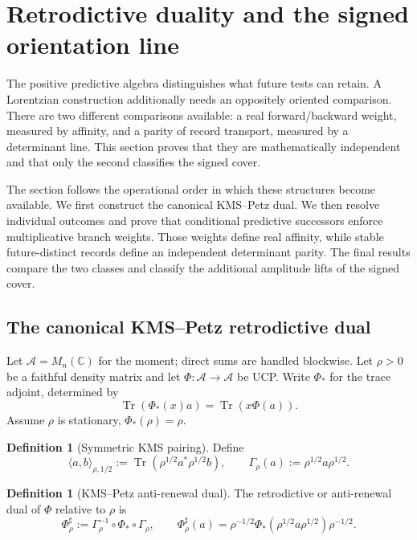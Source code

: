 \documentclass[11pt]{article}
\theoremstyle{definition}
\newtheorem{definition}[theorem]{Definition}
\theoremstyle{remark}
\newcommand{\C}{\mathbb C}
\newcommand{\Tr}{\operatorname{Tr}}
\newcommand{\A}{\mathcal A}
\newcommand{\GammaR}{\Gamma_{\rho}}
\begin{document}
\section{Retrodictive duality and the signed orientation line}
\label{sec:retrodictive}

The positive predictive algebra distinguishes what future tests can retain.  A
Lorentzian construction additionally needs an oppositely oriented comparison.
There are two different comparisons available: a real forward/backward
weight, measured by affinity, and a parity of record transport, measured by a
determinant line.  This section proves that they are mathematically
independent and that only the second classifies the signed cover.

The section follows the operational order in which these structures become
available.  We first construct the canonical KMS--Petz dual.  We then resolve
individual outcomes and prove that conditional predictive successors enforce
multiplicative branch weights.  Those weights define real affinity, while stable
future-distinct records define an independent determinant parity.  The final
results compare the two classes and classify the additional amplitude lifts of
the signed cover.

\subsection{The canonical KMS--Petz retrodictive dual}

Let $\A=M_n(\C)$ for the moment; direct sums are handled blockwise.  Let
$\rho>0$ be a faithful density matrix and let $\Phi:\A\to\A$ be UCP.  Write
$\Phi_*$ for the trace adjoint, determined by
\[
 \Tr(\Phi_*(x)a)=\Tr(x\Phi(a)).
\]
Assume $\rho$ is stationary, $\Phi_*(\rho)=\rho$.

\begin{definition}[Symmetric KMS pairing]
\label{def:kms-pairing}
Define
\[
 \langle a,b\rangle_{\rho,1/2}
 :=\Tr\!\left(\rho^{1/2}a^*\rho^{1/2}b\right),
 \qquad
 \GammaR(a):=\rho^{1/2}a\rho^{1/2}.
\]
\end{definition}

\begin{definition}[KMS--Petz anti-renewal dual]
\label{def:petz-dual}
The retrodictive or anti-renewal dual of $\Phi$ relative to $\rho$ is
\[
 \boxed{
 \Phi_\rho^\sharp
 :=\GammaR^{-1}\circ\Phi_*\circ\GammaR,
 \qquad
 \Phi_\rho^\sharp(a)
 =\rho^{-1/2}\Phi_*(\rho^{1/2}a\rho^{1/2})\rho^{-1/2}.}
\]
\end{definition}
\end{document}
